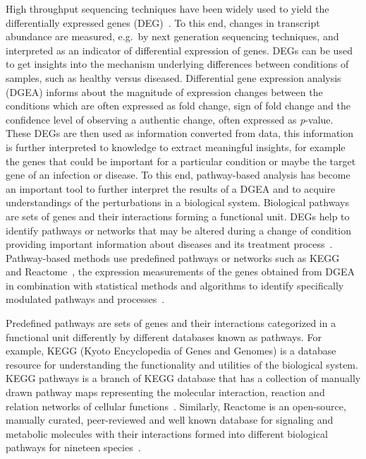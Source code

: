 \documentclass[twocolumn]{article}
\begin{document}
High throughput sequencing techniques have been widely used to yield
the differentially expressed genes (DEG)~\cite{DEG}. To this end,
changes in transcript abundance are measured, e.g.~by next generation
sequencing techniques, and interpreted as an indicator of differential
expression of genes. DEGs can be used to get
insights into the mechanism underlying differences between conditions of samples, such as
healthy versus diseased. Differential gene
expression analysis (DGEA) informs about the magnitude of expression changes
between the conditions which are often expressed as fold change, sign of fold change and the confidence level
of observing a authentic change, often expressed as
\textit{p}-value. These DEGs are
then used as information converted from data, this information is further interpreted to knowledge to extract meaningful insights, for example the genes that
could be important for a particular condition or maybe the target gene
of an infection or disease. To this end, pathway-based analysis has become an
important tool to further interpret the results of a DGEA and to
acquire understandings of the perturbations in a biological
system. Biological pathways are sets of genes and their interactions forming a functional
unit. DEGs help to identify pathways or networks that may be altered
during a change of condition providing important information about
diseases and its treatment process~\cite{Khatri2012}. Pathway-based
methods use predefined pathways or networks such as
KEGG~\cite{Kegg} and Reactome~\cite{Reactome}, the expression
measurements of the genes obtained from DGEA in combination with statistical methods and algorithms to
identify specifically modulated pathways and processes~\cite{Campos}.

Predefined pathways are sets of genes and their interactions categorized in a functional unit differently by different databases known as pathways. For example, KEGG (Kyoto Encyclopedia of Genes and Genomes) is a database resource for understanding the functionality and utilities of the biological system. KEGG pathways is a branch of KEGG database that has a collection of manually drawn pathway maps representing the molecular interaction, reaction and relation networks of cellular functions~\cite{Kegg}. Similarly, Reactome is an open-source, manually curated, peer-reviewed and well known database for signaling and metabolic molecules with their interactions formed into different  biological pathways for nineteen species~\cite{Reactome}.
\end{document}
